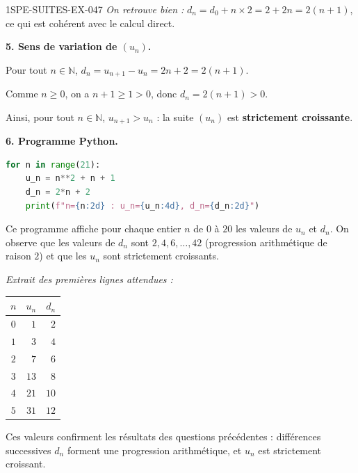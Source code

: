 \begin{corrige}{1SPE-SUITES-EX-047}
\textit{On retrouve bien :} $d_n = d_0 + n \times 2 = 2 + 2n = 2(n+1)$, ce qui est cohérent avec le calcul direct.

\textbf{5. Sens de variation de $(u_n)$.}

Pour tout $n \in \mathbb{N}$, $d_n = u_{n+1} - u_n = 2n + 2 = 2(n+1)$.

Comme $n \geq 0$, on a $n + 1 \geq 1 > 0$, donc $d_n = 2(n+1) > 0$.

Ainsi, pour tout $n \in \mathbb{N}$, $u_{n+1} > u_n$ : la suite $(u_n)$ est \textbf{strictement croissante}.

\textbf{6. Programme Python.}

\begin{lstlisting}[language=Python]
for n in range(21):
    u_n = n**2 + n + 1
    d_n = 2*n + 2
    print(f"n={n:2d} : u_n={u_n:4d}, d_n={d_n:2d}")
\end{lstlisting}

Ce programme affiche pour chaque entier $n$ de $0$ à $20$ les valeurs de $u_n$ et $d_n$. On observe que les valeurs de $d_n$ sont $2, 4, 6, \ldots, 42$ (progression arithmétique de raison $2$) et que les $u_n$ sont strictement croissants.

\textit{Extrait des premières lignes attendues :}
\begin{center}
\begin{tabular}{|c|r|r|}
\hline
$n$ & $u_n$ & $d_n$ \\
\hline
$0$ & $1$ & $2$ \\
$1$ & $3$ & $4$ \\
$2$ & $7$ & $6$ \\
$3$ & $13$ & $8$ \\
$4$ & $21$ & $10$ \\
$5$ & $31$ & $12$ \\
\hline
\end{tabular}
\end{center}

Ces valeurs confirment les résultats des questions précédentes : différences successives $d_n$ forment une progression arithmétique, et $u_n$ est strictement croissant.

\end{corrige}
